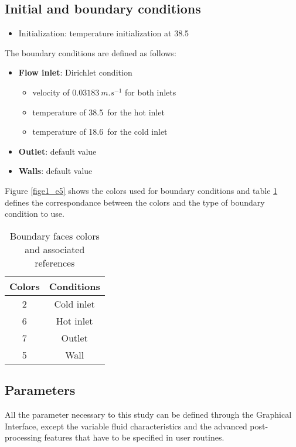 	\subsection{Initial and boundary conditions}

\begin{itemize}
\renewcommand{\labelitemi}{$\rightarrow$}
	\item Initialization: temperature initialization at 38.5\degresC
\end{itemize}

The boundary conditions are defined as follows:

\begin{itemize}
	\item {\bfseries Flow inlet}: Dirichlet condition 
	\begin{itemize}
		\item velocity of $0.03183\ m.s^{-1}$ for both inlets 
	        \item temperature of 38.5\degresC\ for the hot inlet
		\item temperature of 18.6\degresC\ for the cold inlet
	\end{itemize}
	\item {\bfseries Outlet}: default value
	\item {\bfseries Walls}: default value 
\end{itemize}

Figure \ref{fige1_e5} shows the colors used for boundary conditions and 
table \ref{tabante51} defines the correspondance between the colors and  
the type of boundary condition to use.

\begin{table}
\begin{center} 
\begin{tabular}{|c|c|}
\hline
Colors & Conditions \\
\hline
2 & Cold inlet \\
\hline
6 & Hot inlet \\
\hline
7 & Outlet \\
\hline
5 & Wall \\
\hline
\end{tabular} 
\caption{Boundary faces colors and associated references}
\label{tabante51}
\end{center}
\end{table}


	\subsection{Parameters}
All the parameter necessary to this study can be defined through the Graphical
Interface, except the variable fluid characteristics and the advanced
post-processing features that have to be specified in user routines.


